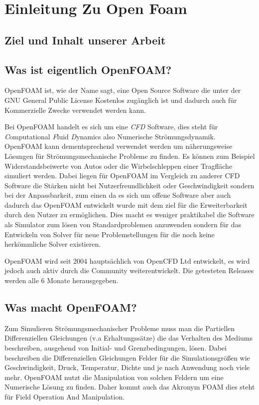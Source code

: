 %
%
%
%
\section{Einleitung Zu Open Foam\label{openfoam:section:Einleitung}}

\subsection{Ziel und Inhalt unserer Arbeit}


\subsection{Was ist eigentlich OpenFOAM?\label{openfoam:section:WasIstOpenFoam}}
OpenFOAM ist, wie der Name sagt, eine Open Source Software die unter der GNU
General Public License Kostenlos zugänglich ist und dadurch auch für Kommerzielle Zwecke 
verwendet werden kann. 

Bei OpenFOAM handelt es sich um eine \emph{CFD} Software, 
dies steht für \emph{C}omputational \emph{F}luid \emph{D}ynamics also Numerische Strömungsdynamik.
OpenFOAM kann dementsprechend verwendet werden um näherungsweise Lösungen für 
Strömungsmechanische Probleme zu finden.
Es können zum Beispiel Widerstandsbeiwerte von Autos oder die Wirbelschleppen einer Tragfläche simuliert werden.
Dabei liegen für OpenFOAM im Vergleich zu anderer CFD Software die Stärken nicht bei Nutzerfreundlichkeit oder Geschwindigkeit sondern bei der Anpassbarkeit, zum einen da es sich um offene Software aber auch dadurch das OpenFOAM entwickelt wurde mit dem ziel für die Erweiterbarkeit durch den Nutzer zu ermöglichen. Dies macht es weniger praktikabel die Software als Simulator zum lösen von Standardproblemen anzuwenden sondern für das Entwickeln von Solver für neue Problemstellungen für die noch keine herkömmliche Solver existieren.

OpenFOAM wird seit 2004 hauptsächlich von OpenCFD Ltd entwickelt, es wird jedoch auch aktiv durch die Community weiterentwickelt.
Die getesteten Releases werden alle 6 Monate herausgegeben. \cite{openfoam:greenshieldsweller2022}

\subsection{Was macht OpenFOAM?}
Zum Simulieren Strömungsmechanischer Probleme muss man die Partiellen Differenziellen Gleichungen (v.a Erhaltungssätze) die das Verhalten des Mediums beschreiben, ausgehend von Initial- und Grenzbedingungen, lösen.
Dabei beschreiben die Differenziellen Gleichungen Felder für die Simulationsgrößen wie Geschwindigkeit, Druck, Temperatur, Dichte und je nach Anwendung noch viele mehr. OpenFOAM nutzt die Manipulation von solchen Feldern um eine Numerische Lösung zu finden. Daher kommt auch das Akronym FOAM dies steht für Field Operation And  Manipulation.


